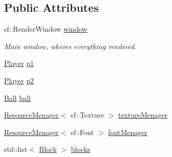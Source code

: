 \subsection*{Public Attributes}
\begin{DoxyCompactItemize}
\item 
sf\+::\+Render\+Window \mbox{\hyperlink{class_game_engine_ac91a68b9e136eda3dc8cabcb46a5dbaa}{window}}
\begin{DoxyCompactList}\small\item\em Main window, where\textquotesingle{}s everything rendered. \end{DoxyCompactList}\item 
\mbox{\hyperlink{class_player}{Player}} \mbox{\hyperlink{class_game_engine_a45f8b7ffe6bf84aeb399155fff5198ea}{p1}}
\item 
\mbox{\hyperlink{class_player}{Player}} \mbox{\hyperlink{class_game_engine_a323b76c16f034ed20826889c7f2103ea}{p2}}
\item 
\mbox{\hyperlink{class_ball}{Ball}} \mbox{\hyperlink{class_game_engine_ad07458d9433b72aa2c9946ccb912b0c9}{ball}}
\item 
\mbox{\hyperlink{class_resource_menager}{Resource\+Menager}}$<$ sf\+::\+Texture $>$ \mbox{\hyperlink{class_game_engine_ab4b2a10f836b40e474862475b8fce137}{texture\+Menager}}
\item 
\mbox{\hyperlink{class_resource_menager}{Resource\+Menager}}$<$ sf\+::\+Font $>$ \mbox{\hyperlink{class_game_engine_aae1aa6983a65e2e41f721603804dd36a}{font\+Menager}}
\item 
std\+::list$<$ \mbox{\hyperlink{class_block}{Block}} $>$ \mbox{\hyperlink{class_game_engine_a2402978b6652462ea8cca5916c9ac16e}{blocks}}
\end{DoxyCompactItemize}
